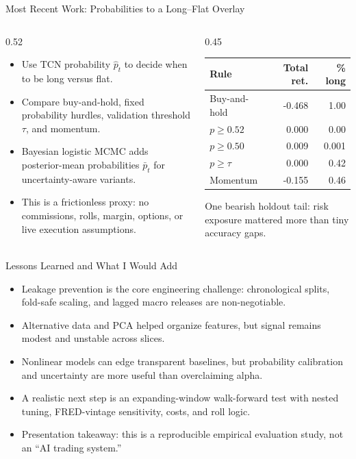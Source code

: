 \documentclass[10pt,aspectratio=169]{beamer}
\begin{document}
\begin{frame}{Most Recent Work: Probabilities to a Long--Flat Overlay}
  \small
  \begin{columns}[T,onlytextwidth]
    \begin{column}{0.52\textwidth}
      \begin{itemize}
        \item Use TCN probability \(\hat p_t\) to decide when to be long versus flat.
        \item Compare buy-and-hold, fixed probability hurdles, validation threshold \(\tau\), and momentum.
        \item Bayesian logistic MCMC adds posterior-mean probabilities \(\bar p_t\) for uncertainty-aware variants.
        \item This is a frictionless proxy: no commissions, rolls, margin, options, or live execution assumptions.
      \end{itemize}
    \end{column}
    \begin{column}{0.45\textwidth}
      \centering
      \begin{tabular}{@{}lrr@{}}
        \toprule
        Rule & Total ret. & \% long \\
        \midrule
        Buy-and-hold & -0.468 & 1.00 \\
        \(p\ge0.52\) & 0.000 & 0.00 \\
        \(p\ge0.50\) & 0.009 & 0.001 \\
        \(p\ge\tau\) & 0.000 & 0.42 \\
        Momentum & -0.155 & 0.46 \\
        \bottomrule
      \end{tabular}
      \vspace{1ex}

      \footnotesize One bearish holdout tail: risk exposure mattered more than tiny accuracy gaps.
    \end{column}
  \end{columns}
\end{frame}

\begin{frame}{Lessons Learned and What I Would Add}
  \begin{itemize}
    \item Leakage prevention is the core engineering challenge: chronological splits, fold-safe scaling, and lagged macro releases are non-negotiable.
    \item Alternative data and PCA helped organize features, but signal remains modest and unstable across slices.
    \item Nonlinear models can edge transparent baselines, but probability calibration and uncertainty are more useful than overclaiming alpha.
    \item A realistic next step is an expanding-window walk-forward test with nested tuning, FRED-vintage sensitivity, costs, and roll logic.
    \item Presentation takeaway: this is a reproducible empirical evaluation study, not an ``AI trading system.''
  \end{itemize}
\end{frame}
\end{document}
